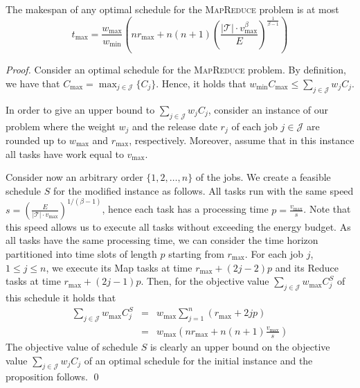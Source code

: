 \documentclass{llncs}
\newcommand{\mr}{\textsc{MapReduce}\xspace}
\begin{document}
\begin{proposition}\label{prop:T}
The makespan of any optimal schedule for the \mr problem is at most
\begin{equation*}
t_{\max} = \frac{w_{\max}}{{w_{\min}}}\left(nr_{\max} + n(n+1) \left(\frac{|\mathcal{T}| \cdot v_{\max}^{\beta}}{E}\right)^{\frac{1}{\beta-1}}\right)
\end{equation*}
\end{proposition}
\begin{proof}
Consider an optimal schedule for the \mr problem.
By definition, we have that $C_{\max}=\max_{j \in \mathcal{J}}\{C_j\}$.
Hence, it holds that $w_{\min} C_{\max} \leq \sum_{j \in \mathcal{J}} w_j C_j$.

In order to give an upper bound to $\sum_{j \in \mathcal{J}} w_j C_j$,
consider an instance of our problem where the weight $w_j$ and the release date $r_j$
of each job $j \in \mathcal{J}$ are rounded up to $w_{\max}$ and $r_{\max}$, respectively.
Moreover, assume that in this instance all tasks have work equal to $v_{\max}$.

Consider now an arbitrary order $\{1,2,\ldots,n\}$ of the jobs.
We create a feasible schedule $S$ for the modified instance as follows.
All tasks run with the same speed $s=\left(\frac{E}{|\mathcal{T}|\cdot v_{\max}}\right)^{1/(\beta-1)}$,
hence each task has a processing time $p=\frac{v_{\max}}{s}$.
Note that this speed allows us to execute all tasks without exceeding the energy budget.
As all tasks have the same processing time, we can consider the time horizon partitioned into time slots of length $p$ starting from $r_{\max}$.
For each job $j$, $1 \leq j \leq n$, we execute its Map tasks at time $r_{\max}+(2j-2)p$
and its Reduce tasks at time $r_{\max}+(2j-1)p$.
Then, for the objective value $\sum_{j \in \mathcal{J}} w_{\max} C_j^S$ of this schedule it holds that
\begin{eqnarray*}
\sum_{j \in \mathcal{J}} w_{\max} C_j^S
& = & w_{\max} \sum_{j=1}^n (r_{\max} + 2jp)\\
& = & w_{\max}\left(n r_{\max} + n(n+1)\frac{v_{\max}}{s}\right)
\end{eqnarray*}
The objective value of schedule $S$ is clearly an upper bound on the objective value
$\sum_{j \in \mathcal{J}} w_j C_j$ of an optimal schedule for the initial instance and the proposition follows.
\qed
\end{proof}
\end{document}
